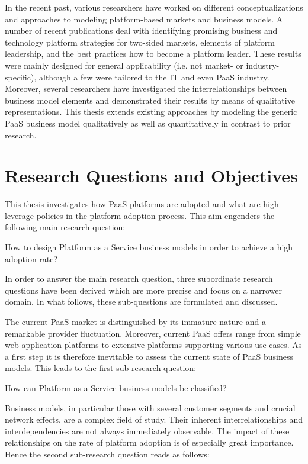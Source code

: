 In the recent past, various researchers have worked on different conceptualizations and approaches to modeling platform-based markets and business models. A number of recent publications deal with identifying promising business and technology platform strategies for two-sided markets, elements of platform leadership, and the best practices how to become a platform leader. These results were mainly designed for general applicability (i.e. not market- or industry-specific), although a few were tailored to the \ac{IT} and even \ac{PaaS} industry. Moreover, several researchers have investigated the interrelationships between business model elements and demonstrated their results by means of qualitative representations. This thesis extends existing approaches by modeling the generic \ac{PaaS} business model qualitatively  as well as quantitatively in contrast to prior research.

\section{Research Questions and Objectives}\label{ch:intro:rq}

This thesis investigates how \ac{PaaS} platforms are adopted and what are high-leverage policies in the platform adoption process. This aim engenders the following main research question:

\begin{MRQ}\label{mrq}
How to design Platform as a Service business models in order to achieve a high adoption rate?
\end{MRQ}

In order to answer the main research question, three subordinate research questions have been derived which are more precise and focus on a narrower domain. In what follows, these sub-questions are formulated and discussed.

The current \ac{PaaS} market is distinguished by its immature nature and a remarkable provider fluctuation. Moreover, current \ac{PaaS} offers range from simple web application platforms to extensive platforms supporting various use cases. As a first step it is therefore inevitable to assess the current state of \ac{PaaS} business models. This leads to the first sub-research question:

\begin{SRQ}\label{srq1}
How can Platform as a Service business models be classified?
\end{SRQ}

Business models, in particular those with several customer segments and crucial network effects, are a complex field of study. Their inherent interrelationships and interdependencies are not always immediately observable. The impact of these relationships on the rate of platform adoption is of especially great importance. Hence the second sub-research question reads as follows:

